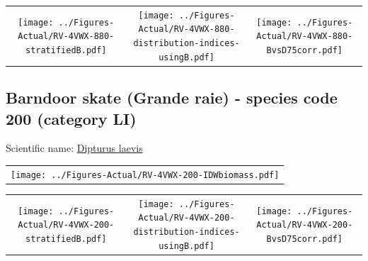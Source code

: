 \documentclass[12pt]{article}\usepackage[]{graphicx}\usepackage[]{color}
\begin{document}
\vspace{1cm}
\begin{minipage}{1.0\textwidth}
 \begin{tabular}{ccc}
\texttt{[image: ../Figures-Actual/RV-4VWX-880-stratifiedB.pdf]} & 
\texttt{[image: ../Figures-Actual/RV-4VWX-880-distribution-indices-usingB.pdf]} & 
\texttt{[image: ../Figures-Actual/RV-4VWX-880-BvsD75corr.pdf]} \\ 
\end{tabular} 
\end{minipage}
\clearpage

\renewcommand\thefigure{\thesubsection\Alph{figure}}

\setcounter{figure}{0}

\hypertarget{sec:200}{%
\subsection{Barndoor skate (Grande raie) - species code 200 (category LI)}\label{sec:200}}

  


Scientific name: \href{http://www.marinespecies.org/aphia.php?p=taxdetails\&id=158548}{Dipturus laevis} \newline
\begin{minipage}{1.0\textwidth}
 \begin{tabular}{c}
\texttt{[image: ../Figures-Actual/RV-4VWX-200-IDWbiomass.pdf]} \\ 
\end{tabular} 
\end{minipage}
\newline

\vspace{1cm}
\begin{minipage}{1.0\textwidth}
 \begin{tabular}{ccc}
\texttt{[image: ../Figures-Actual/RV-4VWX-200-stratifiedB.pdf]} & 
\texttt{[image: ../Figures-Actual/RV-4VWX-200-distribution-indices-usingB.pdf]} & 
\texttt{[image: ../Figures-Actual/RV-4VWX-200-BvsD75corr.pdf]} \\ 
\end{tabular} 
\end{minipage}
\clearpage
\end{document}
